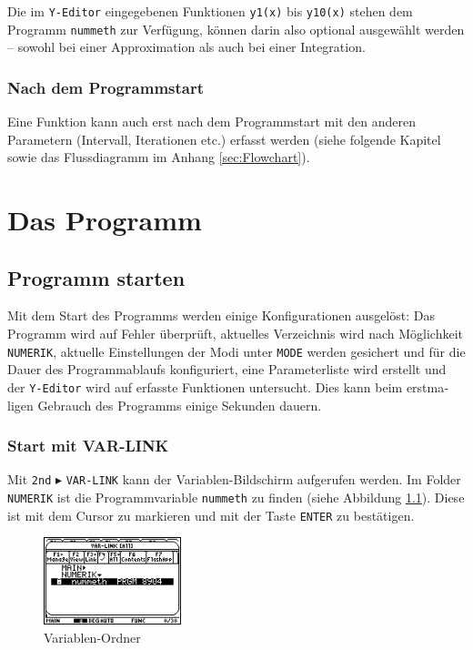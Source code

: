 \documentclass[a5paper,9pt]{scrreprt}
\begin{document}
Die im \verb|Y-Editor| eingegebenen Funktionen \verb|y1(x)| bis \verb|y10(x)| stehen dem Programm \verb|nummeth| zur Verf\"ugung, k\"onnen darin also optional ausgew\"ahlt werden -- sowohl bei einer Approximation als auch bei einer Inte­gration.

\subsection*{Nach dem Programmstart}
Eine Funktion kann auch erst nach dem Programmstart mit den anderen Parametern (Intervall, Iterationen etc.) erfasst werden (siehe folgende Kapitel sowie das Flussdiagramm im Anhang \ref{sec:Flowchart}).

\chapter{Das Programm}
\section{Programm starten}
Mit dem Start des Programms werden einige Konfigurationen ausgel\"ost: Das Programm wird auf Fehler \"uberpr\"uft, aktuelles Ver­zeich­nis wird nach M\"oglichkeit \verb|NUMERIK|, aktuelle Einstellungen der Modi unter \verb|MODE| werden gesichert und f\"ur die Dauer des Pro­gramm­ab­laufs konfiguriert, eine Parameterliste wird erstellt und der \verb|Y-Editor| wird auf erfasste Funk­tio­nen untersucht. Dies kann beim erst­ma­ligen Gebrauch des Programms einige Sekunden dauern.

\subsection*{Start mit VAR-LINK}
Mit \verb|2nd| $\blacktriangleright$ \verb|VAR-LINK| kann der Variablen-Bildschirm aufgerufen werden. Im Folder \verb|NUMERIK| ist die Pro­gramm­variable \verb|nummeth| zu finden (siehe Abbildung \ref{fig:VARLINK}). Diese ist mit dem Cursor zu markieren und mit der Taste \verb|ENTER| zu bes­t\"a­ti­gen.
\begin{figure}[h]
  \centering
  \includegraphics[width=4cm]{img/nummeth_image001.png}
  \caption{Variablen-Ordner}
  \label{fig:VARLINK}
\end{figure}
\end{document}
